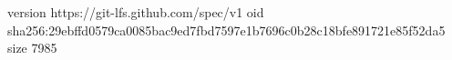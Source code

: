 version https://git-lfs.github.com/spec/v1
oid sha256:29ebffd0579ca0085bac9ed7fbd7597e1b7696c0b28c18bfe891721e85f52da5
size 7985
